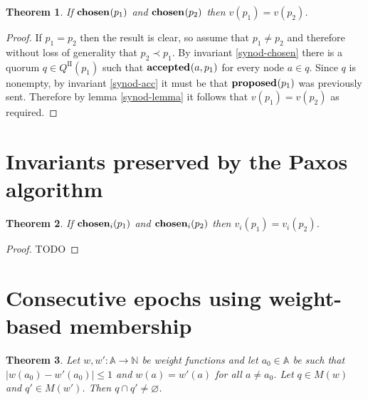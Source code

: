 \documentclass[journal]{IEEEtran}
\newtheorem{theorem}{Theorem}
\begin{document}
\begin{theorem}\label{synod-safety-theorem} If $\mathbf{chosen}_{}(p_1)$ and
$\mathbf{chosen}_{}(p_2)$ then $v(p_1) = v(p_2)$.  \end{theorem}

\begin{proof} If $p_1 = p_2$ then the result is clear, so assume that $p_1 \ne
p_2$ and therefore without loss of generality that $p_2 \prec p_1$. By
invariant \ref{synod-chosen} there is a quorum $q \in Q^\textrm{II}(p_1)$ such
that $\mathbf{accepted}_{}(a,p_1)$ for every node $a \in q$. Since $q$ is nonempty, by
invariant \ref{synod-acc} it must be that $\mathbf{proposed}_{}(p_1)$ was previously sent.
Therefore by lemma \ref{synod-lemma} it follows that $v(p_1) = v(p_2)$ as
required.  \end{proof}




\section{Invariants preserved by the Paxos algorithm}

\begin{theorem}\label{paxos-safety-theorem} If $\mathbf{chosen}_{i}(p_1)$ and
$\mathbf{chosen}_{i}(p_2)$ then $v_i(p_1) = v_i(p_2)$.  \end{theorem}

\begin{proof}TODO\end{proof}

\section{Consecutive epochs using weight-based membership}

\begin{theorem} \label{weights-nearly-equal} Let $w, w' : \mathbb A \to \mathbb
N$ be weight functions and let $a_0 \in \mathbb A$ be such that $|w(a_0) -
w'(a_0)| \le 1$ and $w(a) = w'(a)$ for all $a \ne a_0$.  Let $q \in M(w)$ and
$q' \in M(w')$. Then $q \cap q' \ne \varnothing$.  \end{theorem}
\end{document}

